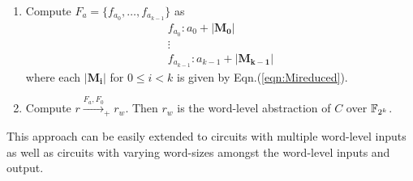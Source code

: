 \begin{enumerate}
\item \label{alg:secondpoly} Compute $F_a=\{f_{a_0},\dots,f_{a_{k-1}}\}$ as
\begin{eqnarray}
&f_{a_0} : a_0 + |\mathbf{M_0}|& \nonumber \\
&\vdots& \nonumber \\
&f_{a_{k-1}} : a_{k-1} + |\mathbf{M_{k-1}}|&
\end{eqnarray}
where each $|\mathbf{M_i}|$ for $0\leq i<k$ is given by Eqn.(\ref{eqn:Mireduced}).
\item \label{alg:secondred}Compute $r\xrightarrow{F_a,F_0}_+ r_w$. Then $r_w$ is the word-level abstraction of $C$ over ${\mathbb{F}}_{2^k}$.
\end{enumerate}
This approach can be easily extended to circuits with multiple word-level inputs as 
well as circuits with varying word-sizes amongst the word-level inputs and output.

